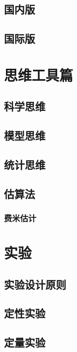 \documentclass[]{book}
\begin{document}
\section{国内版}

\section{国际版}

\chapter{思维工具篇}

\section{科学思维}

\section{模型思维}

\section{统计思维}

\section{估算法}

\subsection{费米估计}

\chapter{实验}

\section{实验设计原则}

\section{定性实验}

\section{定量实验}
\end{document}
